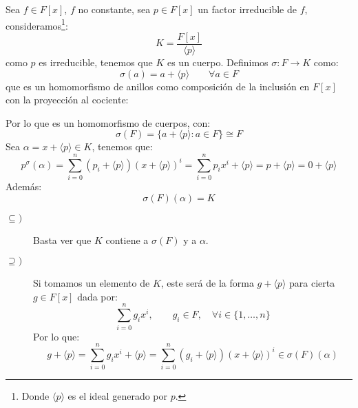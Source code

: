\begin{ejemplo}
    Sea $f\in F[x]$, $f$ no constante, sea $p\in F[x]$ un factor irreducible de $f$, consideramos\footnote{Donde $\langle p \rangle $ es el ideal generado por $p$.}:
    \begin{equation*}
        K = \dfrac{F[x]}{\langle p \rangle }
    \end{equation*}
    como $p$ es irreducible, tenemos que $K$ es un cuerpo. Definimos $\sigma:F\to K$ como:
    \begin{equation*}
        \sigma(a) = a + \langle p \rangle  \qquad \forall a\in F
    \end{equation*}
    que es un homomorfismo de anillos como composición de la inclusión en $F[x]$ con la proyección al cociente:
    \begin{figure}[H]
        \centering
    \end{figure}
    \noindent
    Por lo que es un homomorfismo de cuerpos, con:
    \begin{equation*}
        \sigma(F) = \{a+\langle p \rangle : a\in F\} \cong F
    \end{equation*}
    Sea $\alpha = x+\langle p \rangle \in K$, tenemos que:
    \begin{equation*}
        p^\sigma(\alpha) = \sum_{i=0}^{n} (p_i + \langle p \rangle){(x+\langle p \rangle )}^{i} = \sum_{i=0}^{n} p_ix^i + \langle p \rangle  = p + \langle p \rangle  = 0 + \langle p \rangle 
    \end{equation*}
    Además:
    \begin{equation*}
        \sigma(F)(\alpha) = K
    \end{equation*}
    \begin{description}
        \item [$\subseteq )$] Basta ver que $K$ contiene a $\sigma(F)$ y a $\alpha$.
        \item [$\supseteq )$] Si tomamos un elemento de $K$, este será de la forma $g+\langle p \rangle $ para cierta $g\in F[x]$ dada por:
            \begin{equation*}
                \sum_{i=0}^{n}g_ix^i, \qquad g_i \in F, \quad \forall i \in \{1,\ldots,n\}
            \end{equation*}
            Por lo que:
            \begin{equation*}
                g+\langle p \rangle  = \sum_{i=0}^{n}g_ix^i + \langle p \rangle  = \sum_{i=0}^{n}(g_i+\langle p \rangle ){(x+\langle p \rangle )}^{i} \in \sigma(F)(\alpha)
            \end{equation*}
    \end{description}
\end{ejemplo}

